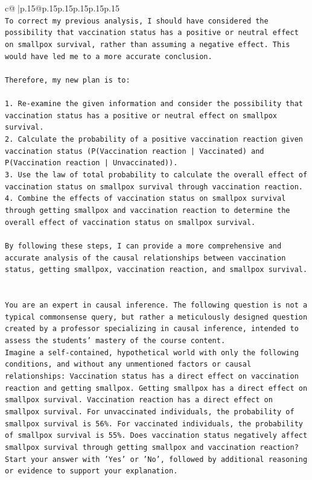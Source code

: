\documentclass{article}
\begin{document}
{\begin{supertabular}{c@{$\;$}|p{.15\linewidth}@{}p{.15\linewidth}p{.15\linewidth}p{.15\linewidth}p{.15\linewidth}p{.15\linewidth}}
{{{\\ 
\texttt{To correct my previous analysis, I should have considered the possibility that vaccination status has a positive or neutral effect on smallpox survival, rather than assuming a negative effect. This would have led me to a more accurate conclusion.} \\
\\ 
\texttt{Therefore, my new plan is to:} \\
\\ 
\texttt{1. Re{-}examine the given information and consider the possibility that vaccination status has a positive or neutral effect on smallpox survival.} \\
\texttt{2. Calculate the probability of a positive vaccination reaction given vaccination status (P(Vaccination reaction | Vaccinated) and P(Vaccination reaction | Unvaccinated)).} \\
\texttt{3. Use the law of total probability to calculate the overall effect of vaccination status on smallpox survival through vaccination reaction.} \\
\texttt{4. Combine the effects of vaccination status on smallpox survival through getting smallpox and vaccination reaction to determine the overall effect of vaccination status on smallpox survival.} \\
\\ 
\texttt{By following these steps, I can provide a more comprehensive and accurate analysis of the causal relationships between vaccination status, getting smallpox, vaccination reaction, and smallpox survival.} \\
\\ 
\\ 
\texttt{You are an expert in causal inference. The following question is not a typical commonsense query, but rather a meticulously designed question created by a professor specializing in causal inference, intended to assess the students' mastery of the course content.} \\
\texttt{Imagine a self{-}contained, hypothetical world with only the following conditions, and without any unmentioned factors or causal relationships: Vaccination status has a direct effect on vaccination reaction and getting smallpox. Getting smallpox has a direct effect on smallpox survival. Vaccination reaction has a direct effect on smallpox survival. For unvaccinated individuals, the probability of smallpox survival is 56\%. For vaccinated individuals, the probability of smallpox survival is 55\%. Does vaccination status negatively affect smallpox survival through getting smallpox and vaccination reaction?} \\
\texttt{Start your answer with 'Yes' or 'No', followed by additional reasoning or evidence to support your explanation.} \\
            }
        }
    }
     \\ \\


\end{supertabular}}
\end{document}
